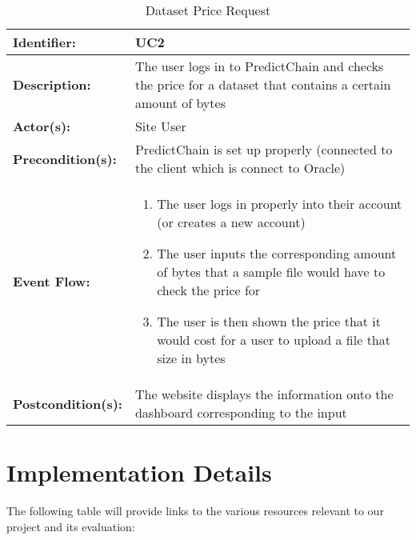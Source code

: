 \documentclass{article}
\begin{document}
    \begin{table}[H]
        \caption{Dataset Price Request}
        \label{tab:ds-price-request}
        \centering
        \begin{tabular}{|p{3cm}|p{8cm}|}
            \hline
            \textbf{Identifier:} & UC2 \\
            \hline
            \textbf{Description:} & The user logs in to PredictChain and checks the price for a dataset that contains a
            certain amount of bytes\\
            \hline
            \textbf{Actor(s):} & Site User \\
            \hline
            \textbf{Precondition(s):} & PredictChain is set up properly (connected to the client which is connect to Oracle) \\
            \hline
            \textbf{Event Flow:} &
            \begin{enumerate}
                \item The user logs in properly into their account (or creates a new account)
                \item The user inputs the corresponding amount of bytes that a sample file would have to check the price for
                \item The user is then shown the price that it would cost for a user to upload a file that size in bytes
            \end{enumerate} \\
            \hline
            \textbf{Postcondition(s):} & The website displays the information onto the dashboard corresponding to the input \\
            \hline
        \end{tabular}
    \end{table}

    \section{Implementation Details}


    The following table will provide links to the various resources relevant to our project and its evaluation:
\end{document}
